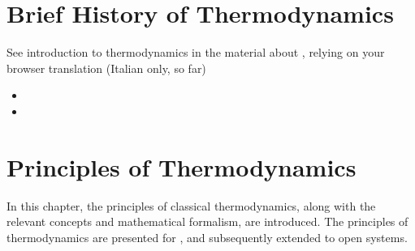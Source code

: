 \documentclass[letterpaper,10pt,english]{jupyterBook}
\begin{document}
\chapter{Brief History of Thermodynamics}
\label{\detokenize{ch/history:brief-history-of-thermodynamics}}\label{\detokenize{ch/history:classical-thermodynamics-history}}\label{\detokenize{ch/history::doc}}
\sphinxAtStartPar
See introduction to thermodynamics in the material about , relying on your browser translation (Italian only, so far)
\begin{itemize}
\item {} 
\sphinxAtStartPar
{}

\item {} 
\sphinxAtStartPar
{}

\end{itemize}



\sphinxstepscope


\chapter{Principles of Thermodynamics}
\label{\detokenize{ch/principles:principles-of-thermodynamics}}\label{\detokenize{ch/principles:physics-hs-thermodynamics-principles}}\label{\detokenize{ch/principles::doc}}
\sphinxAtStartPar
In this chapter, the principles of classical thermodynamics, along with the relevant concepts and mathematical formalism, are introduced.
The principles of thermodynamics are presented for , and subsequently extended to open systems.
\end{document}
